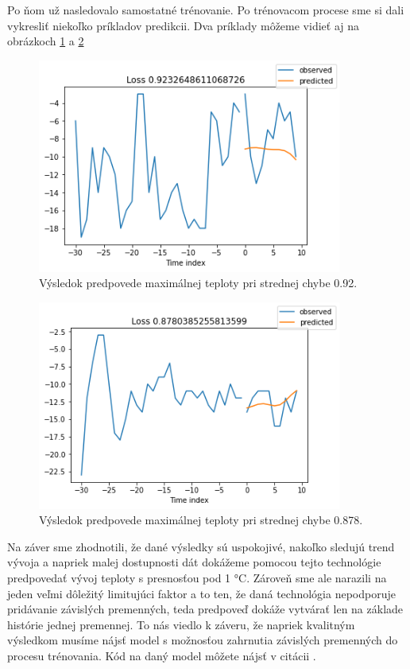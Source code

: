 \newpage
Po ňom už nasledovalo samostatné trénovanie. Po trénovacom procese sme si dali vykresliť niekoľko príkladov predikcii. Dva príklady môžeme vidieť aj na obrázkoch \ref{beats_res1} a \ref{beats_res2}
\begin{figure}[!htbp]
  \centering
  \includegraphics[width=10cm]{img/beats_res1.png}
  \caption{Výsledok predpovede maximálnej teploty pri strednej chybe 0.92.}
  \label{beats_res1}
\end{figure}
\begin{figure}[!htbp]
  \centering
  \includegraphics[width=10cm]{img/beats_res2.png}
  \caption{Výsledok predpovede maximálnej teploty pri strednej chybe 0.878.}
  \label{beats_res2}
\end{figure}

\newpage
Na záver sme zhodnotili, že dané výsledky sú uspokojivé, nakoľko sledujú trend vývoja a napriek malej dostupnosti dát dokážeme pomocou tejto technológie predpovedať vývoj teploty s presnosťou pod 1 °C. Zároveň sme ale narazili na jeden veľmi dôležitý limitujúci faktor a to ten, že daná technológia nepodporuje pridávanie závislých premenných, teda predpoveď dokáže vytvárať len na základe histórie jednej premennej. To nás viedlo k záveru, že napriek kvalitným výsledkom musíme nájsť model s možnosťou zahrnutia závislých premenných do procesu trénovania. Kód na daný model môžete nájsť v citácii \cite{beats_code}.



